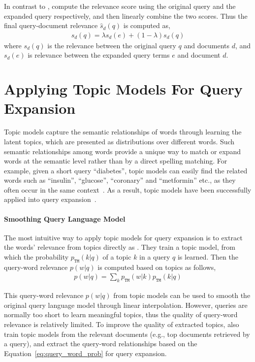 In contrast to \citet{zhai-01b}, \citet{Lavrenko-2001} compute
the relevance score using the original query and the expanded query
respectively, and then linearly combine the two scores. Thus the final
query-document relevance $\hat{s}_d(q)$ is computed as,
\begin{align}
\label{eq:rm_qe_comb}
\hat{s}_d(q) = \lambda s_d(e) + (1-\lambda)s_d(q)
\end{align}
where $s_d(q)$ is the relevance between the original query $q$ and
documents $d$, and $s_d(e)$ is relevance between the expanded query
terms $e$ and document $d$.

\section{Applying Topic Models For Query Expansion}

Topic models capture the semantic relationships of words through
learning the latent topics, which are presented as distributions over
different words. Such semantic relationships among words provide a
unique way to match or expand words at the semantic level rather than
by a direct spelling matching. For example, given a short query ``diabetes'',
topic models can easily find the related words such as
``insulin'', ``glucose'', ``coronary'' and ``metformin'' etc., 
as they often occur in the same context~\citep{Zeng-2012}. 
As a result, topic models have been
successfully applied into query expansion~\citep{Yi-2009,Park-2009,Zeng-2012}.

\paragraph{Smoothing Query Language Model}

The most intuitive way to apply topic models for query expansion is to
extract the words' relevance from topics directly as
\citet{Yi-2009}. They train a topic model, from which the probability
$p_{\texttt{TM}}(k|q)$ of a topic $k$ in a query $q$ is learned. Then
the query-word relevance $p(w|q)$ is computed based on topics as
follows,
\begin{align}
\label{eq:query_word_prob}
p(w|q) = \sum_k p_{\texttt{TM}}(w|k) p_{\texttt{TM}}(k|q)
\end{align}

This query-word relevance $p(w|q)$ from topic models can be used to
smooth the original query language model through linear
interpolation. However, queries are normally too short to learn
meaningful topics, thus the quality of query-word relevance is
relatively limited. To improve the quality of extracted topics,
\citet{Yi-2009} also train topic models from the relevant documents
(e.g., top documents retrieved by a query), and extract the query-word
relationships based on the Equation~\ref{eq:query_word_prob} for query
expansion.

